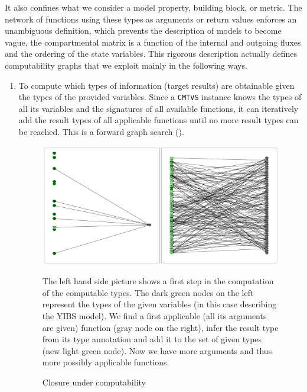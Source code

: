 
It  also confines what we consider a model property, building block, or
metric. The network of functions using these types as arguments or return values
enforces an unambiguous definition, which prevents the description of models to
become vague, \eg the compartmental matrix is a function of the internal and outgoing fluxes and the ordering of the state variables.  
This rigorous description actually defines computability graphs that we exploit mainly in the following ways.
\begin{enumerate}
  \item
  \label{enum:computable}
  To compute which types of information (target results) are obtainable given the types of the provided variables. 
  Since a \texttt{CMTVS} instance knows the types of all its variables and the signatures of all
  available functions, it can iteratively add the result types of all applicable functions until no
  more result types can be reached. This is a forward graph search ().
    \begin{figure}[h]
      \includegraphics[width=\textwidth]{closure.pdf}
      \caption{Closure under computability} 

      The left hand side picture shows a first step in the computation of the
      computable types.  
      The dark green nodes on the left represent the types of the given variables
      (in this case describing the YIBS model).
      We find a first applicable (\ie all its arguments are
      given) function (gray node on the right), infer the result type from its
      type annotation and add it to the set of given types (new light green
      node).  Now we have more arguments and thus more possibly applicable
      functions.


\end{figure}
\end{enumerate}
